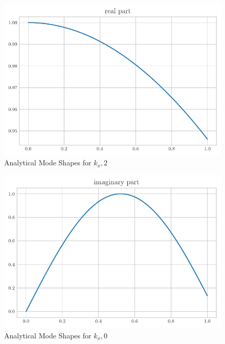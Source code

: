 \documentclass[a4paper]{article}
\begin{document}
 \begin{figure}[h!]
     \centering
     \includegraphics{k_x_2_re.pdf}
     \caption{Analytical Mode Shapes for $k_x,2$}
     \label{fig:kx0}
 \end{figure}

 \begin{figure}[h!]
     \centering
     \includegraphics{k_x_0_im.pdf}
     \caption{Analytical Mode Shapes for $k_x,0$}
 \end{figure}
\end{document}
